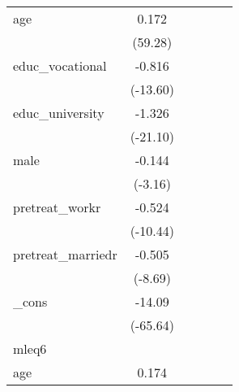 {\begin{tabular}{l*{5}{c}}
age         &       0.172\sym{***}&                     &                     &                     &                     \\
            &     (59.28)         &                     &                     &                     &                     \\
[1em]
educ\_vocational&      -0.816\sym{***}&                     &                     &                     &                     \\
            &    (-13.60)         &                     &                     &                     &                     \\
[1em]
educ\_university&      -1.326\sym{***}&                     &                     &                     &                     \\
            &    (-21.10)         &                     &                     &                     &                     \\
[1em]
male        &      -0.144\sym{**} &                     &                     &                     &                     \\
            &     (-3.16)         &                     &                     &                     &                     \\
[1em]
pretreat\_workr&      -0.524\sym{***}&                     &                     &                     &                     \\
            &    (-10.44)         &                     &                     &                     &                     \\
[1em]
pretreat\_marriedr&      -0.505\sym{***}&                     &                     &                     &                     \\
            &     (-8.69)         &                     &                     &                     &                     \\
[1em]
\_cons      &      -14.09\sym{***}&                     &                     &                     &                     \\
            &    (-65.64)         &                     &                     &                     &                     \\
\hline
mleq6       &                     &                     &                     &                     &                     \\
age         &       0.174\sym{***}&                     &                     &                     &                     \\

\end{tabular}}
